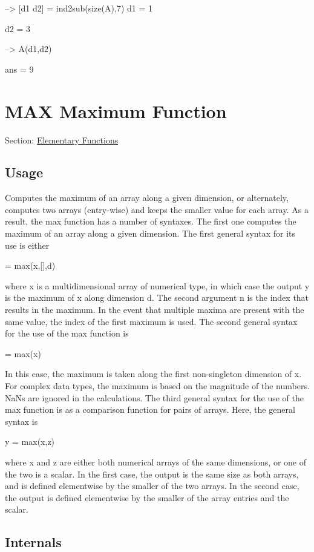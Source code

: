 \begin{DoxyVerbInclude}
--> [d1 d2] = ind2sub(size(A),7)
d1 = 
 1 

d2 = 
 3 

--> A(d1,d2)

ans = 
 9 
\end{DoxyVerbInclude}
 \hypertarget{elementary_max}{}\section{M\-A\-X Maximum Function}\label{elementary_max}
Section\-: \hyperlink{sec_elementary}{Elementary Functions} \hypertarget{vtkwidgets_vtkxyplotwidget_Usage}{}\subsection{Usage}\label{vtkwidgets_vtkxyplotwidget_Usage}
Computes the maximum of an array along a given dimension, or alternately, computes two arrays (entry-\/wise) and keeps the smaller value for each array. As a result, the {\ttfamily max} function has a number of syntaxes. The first one computes the maximum of an array along a given dimension. The first general syntax for its use is either \begin{DoxyVerb}   [y,n] = max(x,[],d)
\end{DoxyVerb}
 where {\ttfamily x} is a multidimensional array of numerical type, in which case the output {\ttfamily y} is the maximum of {\ttfamily x} along dimension {\ttfamily d}. The second argument {\ttfamily n} is the index that results in the maximum. In the event that multiple maxima are present with the same value, the index of the first maximum is used. The second general syntax for the use of the {\ttfamily max} function is \begin{DoxyVerb}   [y,n] = max(x)
\end{DoxyVerb}
 In this case, the maximum is taken along the first non-\/singleton dimension of {\ttfamily x}. For complex data types, the maximum is based on the magnitude of the numbers. Na\-Ns are ignored in the calculations. The third general syntax for the use of the {\ttfamily max} function is as a comparison function for pairs of arrays. Here, the general syntax is \begin{DoxyVerb}   y = max(x,z)
\end{DoxyVerb}
 where {\ttfamily x} and {\ttfamily z} are either both numerical arrays of the same dimensions, or one of the two is a scalar. In the first case, the output is the same size as both arrays, and is defined elementwise by the smaller of the two arrays. In the second case, the output is defined elementwise by the smaller of the array entries and the scalar. \hypertarget{transforms_svd_Function}{}\subsection{Internals}\label{transforms_svd_Function}
